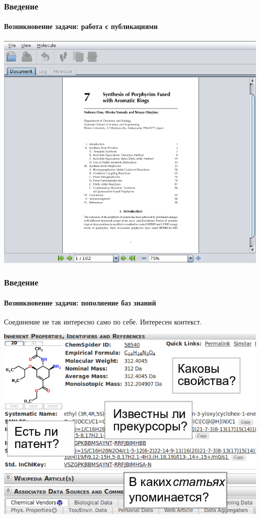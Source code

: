 \begin{frame}
  \frametitle{Введение}
  \framesubtitle{Возникновение задачи: работа с публикациями}
  \begin{center}
    \href{run:media/demo.wmv}{\includegraphics[scale=0.34]{media/demo.png}}
  \end{center}
\end{frame}

\begin{frame}
  \frametitle{Введение}
  \framesubtitle{Возникновение задачи: пополнение баз знаний}
  Соединение не так интересно само по себе. Интересен контекст.
  \begin{center}
     \includegraphics[scale=0.4]{media/chemspider.png}
  \end{center}
\end{frame}

